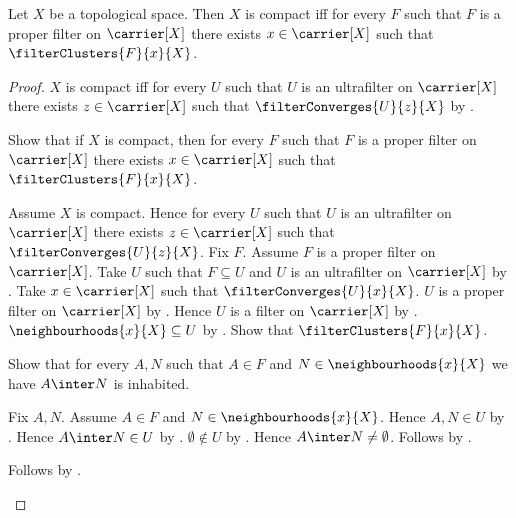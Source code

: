 \begin{theorem}\label{compact_iff_every_proper_filter_has_cluster_point}
    Let $X$ be a topological space.
    Then $X$ is compact iff for every $F$ such that
        $F$ is a proper filter on $\carrier[X]$ there exists
        $x\in\carrier[X]$ such that $\filterClusters{F}{x}{X}$.
\end{theorem}
\begin{proof}
    $X$ is compact iff for every $U$ such that
        $U$ is an ultrafilter on $\carrier[X]$ there exists
        $z\in\carrier[X]$ such that $\filterConverges{U}{z}{X}$ by
        .

    Show that if $X$ is compact, then for every $F$ such that
        $F$ is a proper filter on $\carrier[X]$ there exists
        $x\in\carrier[X]$ such that $\filterClusters{F}{x}{X}$.
    \begin{subproof}
        Assume $X$ is compact.
        Hence for every $U$ such that
            $U$ is an ultrafilter on $\carrier[X]$ there exists
            $z\in\carrier[X]$ such that $\filterConverges{U}{z}{X}$.
        Fix $F$.
        Assume $F$ is a proper filter on $\carrier[X]$.
        Take $U$ such that $F\subseteq U$ and
            $U$ is an ultrafilter on $\carrier[X]$ by
            .
        Take $x\in\carrier[X]$ such that
            $\filterConverges{U}{x}{X}$.
        $U$ is a proper filter on $\carrier[X]$ by
            .
        Hence $U$ is a filter on $\carrier[X]$ by
            .
        $\neighbourhoods{x}{X}\subseteq U$ by
            .
        Show that $\filterClusters{F}{x}{X}$.
        \begin{subproof}
            Show that for every $A,N$ such that $A\in F$ and
                $N\in\neighbourhoods{x}{X}$ we have
                $A\inter N$ is inhabited.
            \begin{subproof}
                Fix $A,N$.
                Assume $A\in F$ and $N\in\neighbourhoods{x}{X}$.
                Hence $A,N\in U$ by .
                Hence $A\inter N\in U$ by .
                $\emptyset\notin U$ by
                    .
                Hence $A\inter N\neq\emptyset$.
                Follows by .
            \end{subproof}
            Follows by .
        \end{subproof}
    \end{subproof}


\end{proof}
